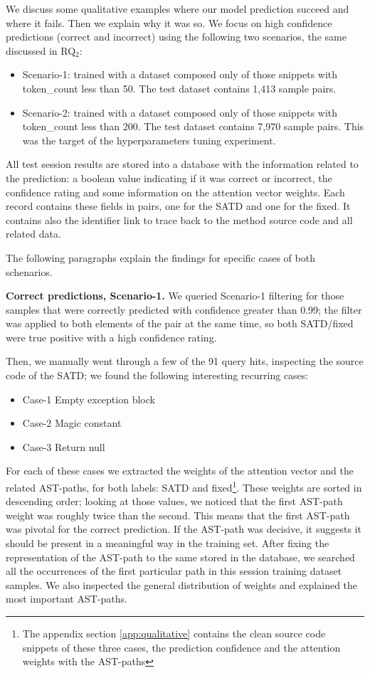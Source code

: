 We discuss some qualitative examples where our model prediction succeed and where it fails. Then we explain why it was so.
We focus on high confidence predictions (correct and incorrect) using the following two scenarios, the same discussed in RQ$_2$:
\begin{itemize}
    \item Scenario-1: trained with a dataset composed only of those snippets with token\_count less than 50. The test dataset contains 1,413 sample pairs.
    \item Scenario-2: trained with a dataset composed only of those snippets with token\_count less than 200. The test dataset contains 7,970 sample pairs. This was the target of the hyperparameters tuning experiment.
\end{itemize}

All test session results are stored into a database with the information related to the prediction: a boolean value indicating if it was correct or incorrect, the confidence rating and some information on the attention vector weights. Each record contains these fields in pairs, one for the SATD and one for the fixed. It contains also the identifier link to trace back to the method source code and all related data.

The following paragraphs explain the findings for specific cases of both schenarios.

\textbf{Correct predictions, Scenario-1.} We queried Scenario-1 filtering for those samples that were correctly predicted with confidence greater than 0.99; the filter was applied to both elements of the pair at the same time, so both SATD/fixed were true positive with a high confidence rating.

Then, we manually went through a few of the 91 query hits, inspecting the source code of the SATD; we found the following interesting recurring cases:
\begin{itemize}
    \item Case-1 Empty exception block %
    \item Case-2 Magic constant %
    \item Case-3 Return null %
\end{itemize}

For each of these cases we extracted the weights of the attention vector and the related AST-paths, for both labels: SATD and fixed\footnote{The appendix section \ref{app:qualitative} contains the clean source code snippets of these three cases, the prediction confidence and the attention weights with the AST-paths}. These weights are sorted in descending order; looking at those values, we noticed that the first AST-path weight was roughly twice than the second. This means that the first AST-path was pivotal for the correct prediction. If the AST-path was decisive, it suggests it should be present in a meaningful way in the training set. After fixing the representation of the AST-path to the same stored in the database, we searched all the occurrences of the first particular path in this session training dataset samples. We also inspected the general distribution of weights and explained the most important AST-paths.


